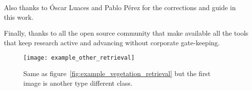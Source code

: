 \documentclass[conference]{IEEEtran}
\begin{document}
    Also thanks to Óscar Luaces and Pablo Pérez for the corrections and guide in this work.

    Finally, thanks to all the open source community that make available all the tools that keep research active and advancing without corporate gate-keeping.




    \begin{figure}[b]
        \centering
        \texttt{[image: example\_other\_retrieval]}
        \caption{Same as figure~\ref{fig:example_vegetation_retrieval} but the first image is another type different class.}
        \label{fig:example_other_retrieval}
    \end{figure}
    
\end{document}
